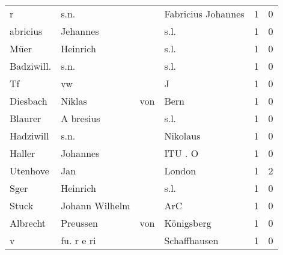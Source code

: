 \begin{tabular}{llllrr}
                        r &                               s.n. &             &                          Fabricius Johannes &          1 &         0 \\
                 abricius &                           Jehannes &             &                                        s.l. &          1 &         0 \\
                     Müer &                           Heinrich &             &                                        s.l. &          1 &         0 \\
               Badziwill. &                               s.n. &             &                                        s.l. &          1 &         0 \\
                       Tf &                                 vw &             &                                           J &          1 &         0 \\
                 Diesbach &                             Niklas &         von &                                        Bern &          1 &         0 \\
                  Blaurer &                          A bresius &             &                                        s.l. &          1 &         0 \\
                Hadziwill &                               s.n. &             &                                    Nikolaus &          1 &         0 \\
                   Haller &                           Johannes &             &                                     ITU . O &          1 &         0 \\
                 Utenhove &                                Jan &             &                                      London &          1 &         2 \\
                     Sger &                           Heinrich &             &                                        s.l. &          1 &         0 \\
                    Stuck &                     Johann Wilhelm &             &                                         ArC &          1 &         0 \\
                 Albrecht &                           Preussen &         von &                                  Königsberg &          1 &         0 \\
                        v &                         fu. r e ri &             &                                Schaffhausen &          1 &         0 \\

\end{tabular}
